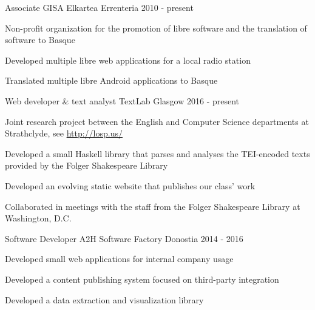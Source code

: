 

\begin{cventries}

  \cventry
    {Associate} %
    {GISA Elkartea} %
    {Errenteria} %
    {2010 - present} %
    {
      \begin{cvitems} %
        \item {Non-profit organization for the promotion of libre software and
            the translation of software to Basque}
        \item {Developed multiple libre web applications for a local radio
            station}
        \item {Translated multiple libre Android applications to Basque}
      \end{cvitems}
    }

  \cventry
    {Web developer \& text analyst} %
    {TextLab} %
    {Glasgow} %
    {2016 - present} %
    {
      \begin{cvitems} %
        \item {Joint research project between the English and Computer Science
            departments at Strathclyde, see \url{http://losp.us/}}
        \item {Developed a small Haskell library that parses and analyses the
            TEI-encoded texts provided by the Folger Shakespeare Library}
        \item {Developed an evolving static website that publishes our class'
            work}
        \item {Collaborated in meetings with the staff from the Folger
            Shakespeare Library at Washington, D.C.}
      \end{cvitems}
    }

  \cventry
    {Software Developer} %
    {A2H Software Factory} %
    {Donostia} %
    {2014 - 2016} %
    {
      \begin{cvitems} %
        \item {Developed small web applications for internal company usage}
        \item {Developed a content publishing system focused on third-party
            integration}
        \item {Developed a data extraction and visualization library}
      \end{cvitems}
    }


\end{cventries}
